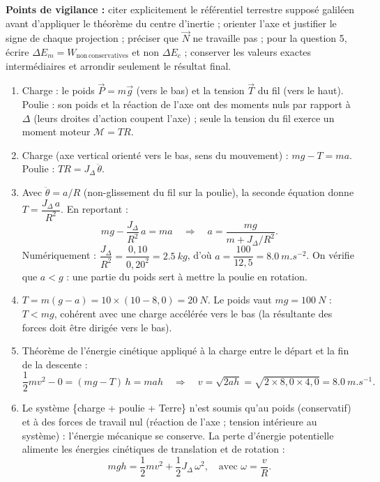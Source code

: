 \documentclass[11pt]{article}
\begin{document}
\begin{corrige}
\textbf{Points de vigilance :} citer explicitement le référentiel terrestre supposé galiléen avant d'appliquer le théorème du centre d'inertie ; orienter l'axe et justifier le signe de chaque projection ; préciser que $\vec{N}$ ne travaille pas ; pour la question 5, écrire $\Delta E_m = W_{\mathrm{non\,conservatives}}$ et non $\Delta E_c$ ; conserver les valeurs exactes intermédiaires et arrondir seulement le résultat final.
\end{corrige}

\begin{corrige}
\begin{enumerate}
\item Charge : le poids $\vec{P} = m\vec{g}$ (vers le bas) et la tension $\vec{T}$ du fil (vers le haut). Poulie : son poids et la réaction de l'axe ont des moments nuls par rapport à $\Delta$ (leurs droites d'action coupent l'axe) ; seule la tension du fil exerce un moment moteur $\mathcal{M} = TR$.
\item Charge (axe vertical orienté vers le bas, sens du mouvement) : $mg - T = ma$. Poulie : $TR = J_\Delta\,\ddot{\theta}$.
\item Avec $\ddot{\theta} = a/R$ (non-glissement du fil sur la poulie), la seconde équation donne $T = \dfrac{J_\Delta\,a}{R^2}$. En reportant :
\[ mg - \frac{J_\Delta}{R^2}\,a = ma \quad\Rightarrow\quad a = \frac{mg}{m + J_\Delta/R^2}. \]
Numériquement : $\dfrac{J_\Delta}{R^2} = \dfrac{0{,}10}{0{,}20^2} = \SI{2,5}{kg}$, d'où $a = \dfrac{100}{12{,}5} = \SI{8,0}{m.s^{-2}}$. On vérifie que $a < g$ : une partie du poids sert à mettre la poulie en rotation.
\item $T = m(g-a) = 10 \times (10 - 8{,}0) = \SI{20}{N}$. Le poids vaut $mg = \SI{100}{N}$ : $T < mg$, cohérent avec une charge accélérée vers le bas (la résultante des forces doit être dirigée vers le bas).
\item Théorème de l'énergie cinétique appliqué à la charge entre le départ et la fin de la descente :
\[ \frac{1}{2}mv^2 - 0 = (mg - T)\,h = mah \quad\Rightarrow\quad v = \sqrt{2ah} = \sqrt{2 \times 8{,}0 \times 4{,}0} = \SI{8,0}{m.s^{-1}}. \]
\item Le système \{charge + poulie + Terre\} n'est soumis qu'au poids (conservatif) et à des forces de travail nul (réaction de l'axe ; tension intérieure au système) : l'énergie mécanique se conserve. La perte d'énergie potentielle alimente les énergies cinétiques de translation et de rotation :
\[ mgh = \frac{1}{2}mv^2 + \frac{1}{2}J_\Delta\,\omega^2, \quad \text{avec } \omega = \frac{v}{R}. \]

\end{enumerate}
\end{corrige}
\end{document}
